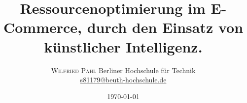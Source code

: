 
\setlength{\droptitle}{-4\baselineskip} %

\pretitle{\begin{center}\Huge\bfseries} %
	\posttitle{\end{center}} %
\title{Ressourcenoptimierung im E-Commerce, durch den Einsatz von künstlicher Intelligenz.} %
\author{%
	\textsc{Wilfried Pahl}%
	\normalsize Berliner Hochschule für Technik \\ %
	\normalsize \href{mailto:s81179@beuth-hochschule.de}{s81179@beuth-hochschule.de} %
}
\date{\today} %


